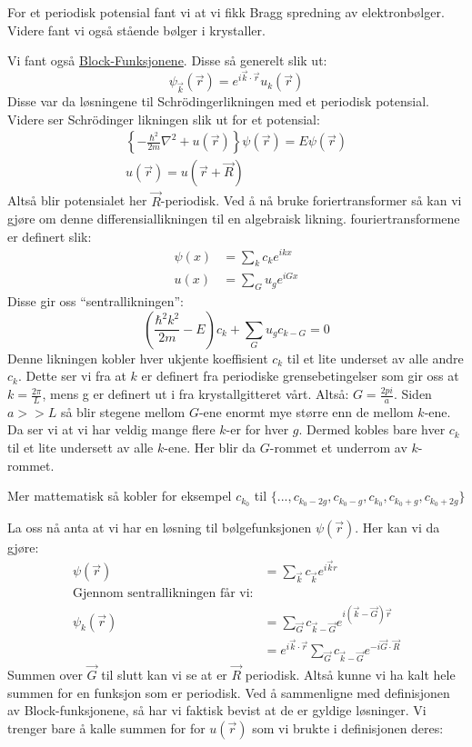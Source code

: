 \documentclass{article}
\begin{document}
For et periodisk potensial fant vi at vi fikk Bragg spredning av elektronbølger. Videre fant vi også stående bølger i krystaller.

Vi fant også \underline{Block-Funksjonene}. Disse så generelt slik ut:
\begin{equation}
  \label{eq:block_funksjoner}
  \psi_{\vec{k}}(\vec{r}) = e^{i\vec{k}\cdot\vec{r}}u_k(\vec{r})
\end{equation}
Disse var da løsningene til Schrödingerlikningen med et periodisk potensial.
Videre ser Schrödinger likningen slik ut for et potensial:
\begin{align}
  \label{eq:schrödinger_likningen_med_periodisk_potensial}
  \left\{  -\frac{\hbar^2}{2m}\nabla^2 + u(\vec{r})  \right\}\psi(\vec{r}) = E\psi(\vec{r}) \\
  u(\vec{r}) = u(\vec{r} + \vec{R})
\end{align}
Altså blir potensialet her $\vec{R}$-periodisk. Ved å nå bruke foriertransformer så kan vi gjøre om denne differensiallikningen til en algebraisk likning. fouriertransformene er definert slik:
\begin{align}
  \psi(x) &= \sum_k c_k e^{ikx} \\
  u(x) &= \sum_G u_g e^{iGx}
\end{align}
Disse gir oss \enquote{sentrallikningen}:
\begin{equation}
  \label{eq:den_sentrale_likningen}
  \left(\frac{\hbar^2 k^2}{2m} - E\right)c_k + \sum_G u_g c_{k-G} = 0
\end{equation}
Denne likningen kobler hver ukjente koeffisient $c_k$ til et lite underset av alle andre $c_k$. Dette ser vi fra at $k$ er definert fra periodiske grensebetingelser som gir oss at $k = \frac{2\pi}{L}$, mens g er definert ut i fra krystallgitteret vårt. Altså: $G = \frac{2pi}{a}$. Siden $a >> L$ så blir stegene mellom $G$-ene enormt mye større enn de mellom $k$-ene. Da ser vi at vi har veldig mange flere $k$-er for hver $g$. Dermed kobles bare hver $c_k$ til et lite undersett av alle $k$-ene. Her blir da $G$-rommet et underrom av $k$-rommet.

Mer mattematisk så kobler for eksempel $c_{k_0}$ til $\{..., c_{k_0 - 2g}, c_{k_0 - g}, c_{k_0}, c_{k_0 + g}, c_{k_0 + 2g}\}$

La oss nå anta at vi har en løsning til bølgefunksjonen $\psi(\vec{r})$.
Her kan vi da gjøre:
\begin{align}
  \psi(\vec{r}) &= \sum_{\vec{k}} c_{\vec{k}} e^{i \vec{k} {r}} \\
  \text{Gjennom sentrallikningen får vi:} \\
   \psi_k(\vec{r})&= \sum_{\vec{G}} c_{\vec{k} - \vec{G}} e^{i(\vec{k} - \vec{G}) 
   \vec{r}} \\
   &= e^{i\vec{k}\cdot\vec{r}} \sum_{\vec{G}}  c_{\vec{k} - \vec{G}}e^{-i \vec{G}\cdot\vec{R}}
\end{align}
Summen over $\vec{G}$ til slutt kan vi se at er $\vec{R}$ periodisk. Altså kunne vi ha kalt hele summen for en funksjon som er periodisk. Ved å sammenligne med definisjonen av Block-funksjonene, så har vi faktisk bevist at de er gyldige løsninger. Vi trenger bare å kalle summen for for $u(\vec{r})$ som vi brukte i definisjonen deres: 
\end{document}
